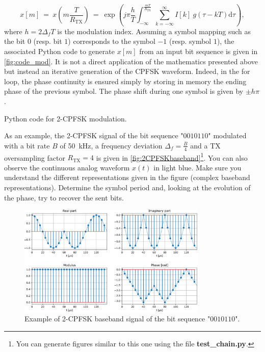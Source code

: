 \begin{equation*}
    x[m] \:=\:x\left(m\frac{T}{R_{\text{TX}}}\right)\:=\:\exp \left(j\pi \frac{h}{T} \int_{-\infty}^{\frac{mT}{R_{\text{TX}}}} \sum_{k=-\infty}^{\infty}I[k]\:g(\tau-kT) \text{d}\tau \right),
\end{equation*}
where $h=2 \Delta_f T$ is the modulation index.
Assuming a symbol mapping such as the bit $0$ (resp. bit $1$) corresponds to the symbol $-1$ (resp. symbol $1$), the associated Python code to generate $x[m]$ from an input bit sequence is given in \autoref{fig:code_mod}. It is not a direct application of the mathematics presented above but instead an iterative generation of the CPFSK waveform. Indeed, in the for loop, the phase continuity is ensured simply by storing in memory the ending phase of the previous symbol. The phase shift during one symbol is given by $\pm h\pi$.

\begin{listing}[H]
\caption{Python code for 2-CPFSK modulation.}
\label{fig:code_mod}
\end{listing}



As an example, the 2-CPFSK signal of the bit sequence "$0010110$" modulated with a bit rate $B$ of \SI{50}{\kilo\hertz}, a frequency deviation $\Delta_f=\frac{B}{4}$ and a TX oversampling factor $R_{\text{TX}}=4$ is given in \autoref{fig:2CPFSKbaseband}\footnote{You can generate figures similar to this one using the file \textbf{test\_chain.py}.}. You can also observe the continuous analog waveform $x(t)$ in light blue. Make sure you understand the different representations given in the figure (complex baseband representations). Determine the symbol period and, looking at the evolution of the phase, try to recover the sent bits.

\begin{figure}[h]
    \centering
    \includegraphics[width=0.8\textwidth]{figures/2-cpfsk-bis.pdf}
    \caption{Example of 2-CPFSK baseband signal of the bit sequence "$0010110$".}
    \label{fig:2CPFSKbaseband}
\end{figure}


